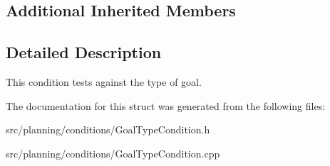 \subsection*{Additional Inherited Members}


\subsection{Detailed Description}
This condition tests against the type of goal. 

The documentation for this struct was generated from the following files\+:\begin{DoxyCompactItemize}
\item 
src/planning/conditions/Goal\+Type\+Condition.\+h\item 
src/planning/conditions/Goal\+Type\+Condition.\+cpp\end{DoxyCompactItemize}
